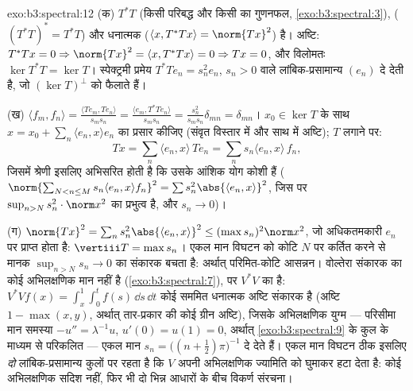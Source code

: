 \begin{solution}{exo:b3:spectral:12}
(क) $T^*T$  (किसी परिबद्ध और किसी  का गुणनफल, \cref{exo:b3:spectral:3}),
 ($(T^*T)^* = T^*T$) और धनात्मक ($\langle x, T^*Tx\rangle =
\norm{Tx}^2$) है। अष्टि: $T^*Tx = 0 \Rightarrow \norm{Tx}^2 =
\langle x, T^*Tx\rangle = 0 \Rightarrow Tx = 0$, और विलोमतः
$\ker T^*T = \ker T$। स्पेक्ट्रमी प्रमेय $T^*Te_n = s_n^2e_n$, $s_n > 0$ वाले लांबिक-प्रसामान्य $(e_n)$
दे देती है, जो $(\ker T)^\perp$ को फैलाते हैं।

(ख) $\langle f_m, f_n\rangle = \frac{\langle Te_m,
Te_n\rangle}{s_ms_n} = \frac{\langle e_m,
T^*Te_n\rangle}{s_ms_n} = \frac{s_n^2}{s_ms_n}\delta_{mn} =
\delta_{mn}$। $x_0 \in \ker T$ के साथ $x = x_0 + \sum_n\langle e_n, x\rangle
e_n$ का प्रसार कीजिए (संवृत विस्तार में
 और साथ में अष्टि);  $T$ लगाने पर:
\[
Tx = \sum_n\langle e_n, x\rangle\,Te_n =
\sum_ns_n\langle e_n, x\rangle\,f_n,
\]
जिसमें श्रेणी इसलिए अभिसरित होती है कि उसके आंशिक योग कोशी हैं ($\norm{\sum_{N<n\leq M}s_n\langle e_n, x\rangle f_n}^2 =
\sum s_n^2\abs{\langle e_n, x\rangle}^2$,
जिस पर $\sup_{n>N}s_n^2\cdot\norm x^2$ का प्रभुत्व है, और $s_n \to 0$)।

(ग) $\norm{Tx}^2 = \sum_ns_n^2\abs{\langle e_n, x\rangle}^2
\leq (\max s_n)^2\norm x^2$, जो अधिकतमकारी $e_n$ पर प्राप्त होता है: $\vertiii T = \max s_n$। एकल मान
विघटन को कोटि $N$ पर कर्तित करने से मानक $\sup_{n>N}s_n \to 0$ का संकारक बचता है:
अर्थात् परिमित-कोटि आसन्नन। वोल्तेरा संकारक का कोई अभिलक्षणिक मान
नहीं है (\cref{exo:b3:spectral:7}), पर $V^*V$ का है: $V^*Vf(x) = \int_x^1\int_0^tf(s)\,\dd s\,\dd t$ कोई सममित धनात्मक अष्टि संकारक
है (अष्टि $1 - \max(x,y)$, अर्थात् तार-प्रकार की कोई ग्रीन अष्टि), जिसके
अभिलक्षणिक युग्म --- परिसीमा मान समस्या $-u'' = \lambda^{-1}u$, $u'(0)
= u(1) = 0$, अर्थात् \cref{exo:b3:spectral:9}
के कुल के माध्यम से परिकलित --- एकल मान $s_n = \bigl((n + \frac12)\pi\bigr)^{-1}$ दे देते हैं। एकल मान
विघटन ठीक इसलिए \emph{दो} लांबिक-प्रसामान्य कुलों पर रहता है कि $V$
अपनी अभिलक्षणिक ज्यामिति को घुमाकर हटा देता है: कोई अभिलक्षणिक सदिश
नहीं, फिर भी दो भिन्न आधारों के बीच  विकर्ण संरचना।
\end{solution}

